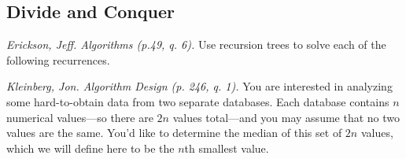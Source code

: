 \documentclass[solutionorbox,answers]{exam}
\begin{document}
\begin{center}
\end{center}
\vspace{0.1in}
 \qquad
{}

\begin{questions}

\section*{Divide and Conquer}

  \question \emph{Erickson, Jeff. Algorithms (p.49, q. 6).} Use recursion trees to solve each of the following recurrences.


\pagebreak

\question \emph{Kleinberg, Jon. Algorithm Design (p. 246, q. 1).} You are interested in analyzing some hard-to-obtain data from two separate databases. Each database contains $n$ numerical values—so there are $2n$ values total—and you may assume that no two values are the same. You’d like to determine the median of this set of $2n$ values, which we will define here to be the $n$th smallest value. 


\end{questions}
\end{document}
